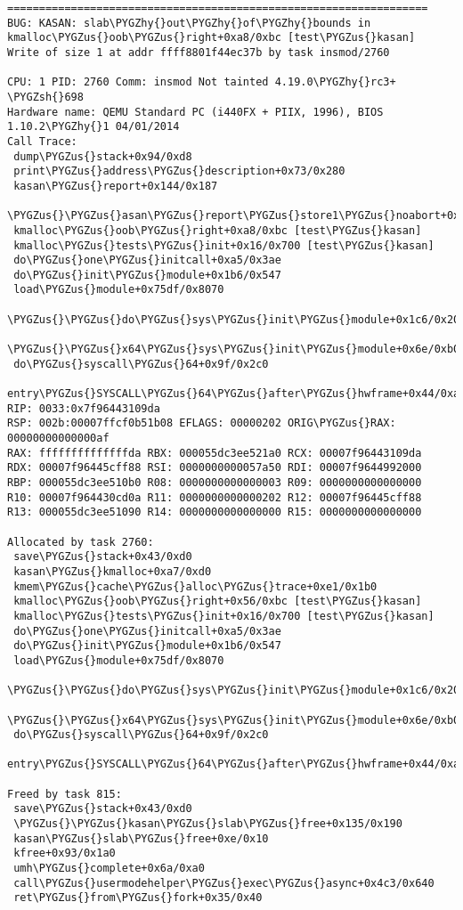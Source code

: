 \documentclass[a4paper,8pt,english]{sphinxmanual}
\def\PYGZus{\char`\_}
\def\PYGZsh{\char`\#}
\def\PYGZhy{\char`\-}
\begin{document}
\begin{Verbatim}[commandchars=\\\{\}]
==================================================================
BUG: KASAN: slab\PYGZhy{}out\PYGZhy{}of\PYGZhy{}bounds in kmalloc\PYGZus{}oob\PYGZus{}right+0xa8/0xbc [test\PYGZus{}kasan]
Write of size 1 at addr ffff8801f44ec37b by task insmod/2760

CPU: 1 PID: 2760 Comm: insmod Not tainted 4.19.0\PYGZhy{}rc3+ \PYGZsh{}698
Hardware name: QEMU Standard PC (i440FX + PIIX, 1996), BIOS 1.10.2\PYGZhy{}1 04/01/2014
Call Trace:
 dump\PYGZus{}stack+0x94/0xd8
 print\PYGZus{}address\PYGZus{}description+0x73/0x280
 kasan\PYGZus{}report+0x144/0x187
 \PYGZus{}\PYGZus{}asan\PYGZus{}report\PYGZus{}store1\PYGZus{}noabort+0x17/0x20
 kmalloc\PYGZus{}oob\PYGZus{}right+0xa8/0xbc [test\PYGZus{}kasan]
 kmalloc\PYGZus{}tests\PYGZus{}init+0x16/0x700 [test\PYGZus{}kasan]
 do\PYGZus{}one\PYGZus{}initcall+0xa5/0x3ae
 do\PYGZus{}init\PYGZus{}module+0x1b6/0x547
 load\PYGZus{}module+0x75df/0x8070
 \PYGZus{}\PYGZus{}do\PYGZus{}sys\PYGZus{}init\PYGZus{}module+0x1c6/0x200
 \PYGZus{}\PYGZus{}x64\PYGZus{}sys\PYGZus{}init\PYGZus{}module+0x6e/0xb0
 do\PYGZus{}syscall\PYGZus{}64+0x9f/0x2c0
 entry\PYGZus{}SYSCALL\PYGZus{}64\PYGZus{}after\PYGZus{}hwframe+0x44/0xa9
RIP: 0033:0x7f96443109da
RSP: 002b:00007ffcf0b51b08 EFLAGS: 00000202 ORIG\PYGZus{}RAX: 00000000000000af
RAX: ffffffffffffffda RBX: 000055dc3ee521a0 RCX: 00007f96443109da
RDX: 00007f96445cff88 RSI: 0000000000057a50 RDI: 00007f9644992000
RBP: 000055dc3ee510b0 R08: 0000000000000003 R09: 0000000000000000
R10: 00007f964430cd0a R11: 0000000000000202 R12: 00007f96445cff88
R13: 000055dc3ee51090 R14: 0000000000000000 R15: 0000000000000000

Allocated by task 2760:
 save\PYGZus{}stack+0x43/0xd0
 kasan\PYGZus{}kmalloc+0xa7/0xd0
 kmem\PYGZus{}cache\PYGZus{}alloc\PYGZus{}trace+0xe1/0x1b0
 kmalloc\PYGZus{}oob\PYGZus{}right+0x56/0xbc [test\PYGZus{}kasan]
 kmalloc\PYGZus{}tests\PYGZus{}init+0x16/0x700 [test\PYGZus{}kasan]
 do\PYGZus{}one\PYGZus{}initcall+0xa5/0x3ae
 do\PYGZus{}init\PYGZus{}module+0x1b6/0x547
 load\PYGZus{}module+0x75df/0x8070
 \PYGZus{}\PYGZus{}do\PYGZus{}sys\PYGZus{}init\PYGZus{}module+0x1c6/0x200
 \PYGZus{}\PYGZus{}x64\PYGZus{}sys\PYGZus{}init\PYGZus{}module+0x6e/0xb0
 do\PYGZus{}syscall\PYGZus{}64+0x9f/0x2c0
 entry\PYGZus{}SYSCALL\PYGZus{}64\PYGZus{}after\PYGZus{}hwframe+0x44/0xa9

Freed by task 815:
 save\PYGZus{}stack+0x43/0xd0
 \PYGZus{}\PYGZus{}kasan\PYGZus{}slab\PYGZus{}free+0x135/0x190
 kasan\PYGZus{}slab\PYGZus{}free+0xe/0x10
 kfree+0x93/0x1a0
 umh\PYGZus{}complete+0x6a/0xa0
 call\PYGZus{}usermodehelper\PYGZus{}exec\PYGZus{}async+0x4c3/0x640
 ret\PYGZus{}from\PYGZus{}fork+0x35/0x40


\end{Verbatim}
\end{document}

